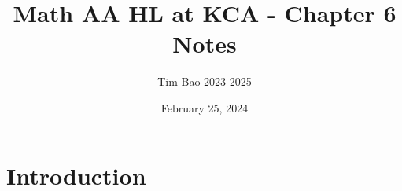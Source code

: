 \documentclass[11pt]{article}
\title{Math AA HL at KCA - Chapter 6 Notes}
\author{Tim Bao 2023-2025}
\date{February 25, 2024}
\begin{document}
\maketitle
\pagebreak

\section{Introduction}
\end{document}

